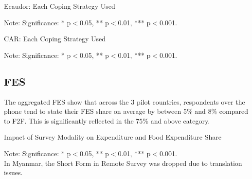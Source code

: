 \documentclass[11pt,harvard]{article}
\begin{document}
\begin{table}[htbp]
	\centering
	\begin{adjustbox}{max width=\textwidth}
		\begin{threeparttable}
			\caption{Ecaudor: Each Coping Strategy Used}
			\scriptsize
			 
			\label{tab:LCS_Ind_Modality_Ecuador}
			\begin{tablenotes}
				\item Note: Significance: * p$<$0.05, ** p$<$0.01, *** p$<$0.001. 
			\end{tablenotes}
		\end{threeparttable}
	\end{adjustbox}
	
\end{table}
\begin{table}[htbp]
	\centering
	\begin{adjustbox}{max width=\textwidth}
		\begin{threeparttable}
			\caption{CAR: Each Coping Strategy Used}
			\scriptsize
			 
			\label{tab:LCS_Ind_Modality_CAR}
			\begin{tablenotes}
				\item Note: Significance: * p$<$0.05, ** p$<$0.01, *** p$<$0.001. 
			\end{tablenotes}
		\end{threeparttable}
	\end{adjustbox}
\end{table}

\pagebreak

\subsection{FES}

The aggregated FES show that across the 3 pilot countries, respondents over the phone tend to state their FES share on average by between 5\% and 8\% compared to F2F. This is significantly reflected in the 75\% and above category.

\begin{table}[htbp]
	\centering
	\begin{adjustbox}{max width=\textwidth}
		\begin{threeparttable}
			\caption{Impact of Survey Modality on Expenditure and Food Expenditure Share}
			\scriptsize
			 
			\label{tab:FES_Modality_All_Country}
			\begin{tablenotes}
				\item Note: Significance: * p$<$0.05, ** p$<$0.01, *** p$<$0.001. \\ 
				In Myanmar, the Short Form in Remote Survey was dropped due to translation issues.
			\end{tablenotes}
		\end{threeparttable}
	\end{adjustbox}
\end{table}
\end{document}
